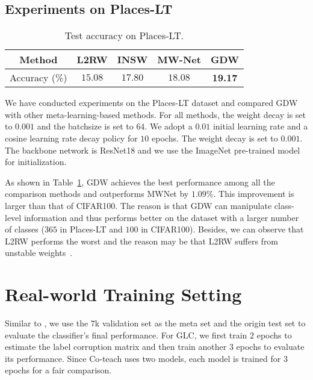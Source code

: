 \subsection{Experiments on Places-LT}

\begin{table}[htbp]
    \centering
    \caption{Test accuracy on Places-LT.}
    \label{tab:mix_placeLT}
    \begin{tabular}{@{}ccccc@{}}
\toprule
Method & L2RW & INSW & MW-Net & \textbf{GDW} \\
\midrule
Accuracy (\%) & \(15.08\) & \(17.80\) & \(18.08\) & \textbf{19.17} \\
\bottomrule
    \end{tabular}
    
\end{table}
We have conducted experiments on the Places-LT dataset \cite{liuLargeScaleLongTailedRecognition2019} and compared GDW with other meta-learning-based methods.
%
For all methods, the weight decay is set to $0.001$ and the batchsize is set to $64$. We adopt a $0.01$ initial learning rate and a cosine learning rate decay policy for $10$ epochs. The weight decay is set to $0.001$. The backbone network is ResNet18 and we use the ImageNet pre-trained model for initialization.

As shown in Table~\ref{tab:mix_placeLT}, GDW achieves the best performance among all the comparison methods and outperforms MWNet by $1.09\%$. This improvement is larger than that of CIFAR100. The reason is that GDW can manipulate class-level information and thus performs better on the dataset with a larger number of classes ($365$ in Places-LT and $100$ in CIFAR100). Besides, we can observe that L2RW performs the worst and the reason may be that L2RW suffers from unstable weights~\cite{shuMetaWeightNetLearningExplicit2019a}.

\section{Real-world Training Setting}
\label{section: Appendix_E}
Similar to \cite{shuMetaWeightNetLearningExplicit2019a}, we use the $7$k validation set as the meta set and the origin test set to evaluate the classifier's final performance.
%
For GLC, we first train $2$ epochs to estimate the label corruption matrix and then train another $3$ epochs to evaluate its performance.
%
Since Co-teach uses two models, each model is trained for $3$ epochs for a fair comparison.

